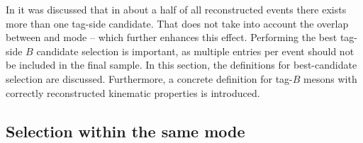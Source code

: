 In  it was discussed that in about a half of all reconstructed events there exists more than one tag-side candidate.
That does not take into account the overlap between \feiBp and \feiBz mode -- which further enhances this effect.
Performing the best tag-side $B$ candidate selection is important, as multiple entries per event should not be included in the final sample.
In this section, the definitions for best-candidate selection are discussed.
Furthermore, a concrete definition for tag-$B$ mesons with correctly reconstructed kinematic properties is introduced.

\subsection{Selection within the same \texorpdfstring{\FEI}{FEI} mode}